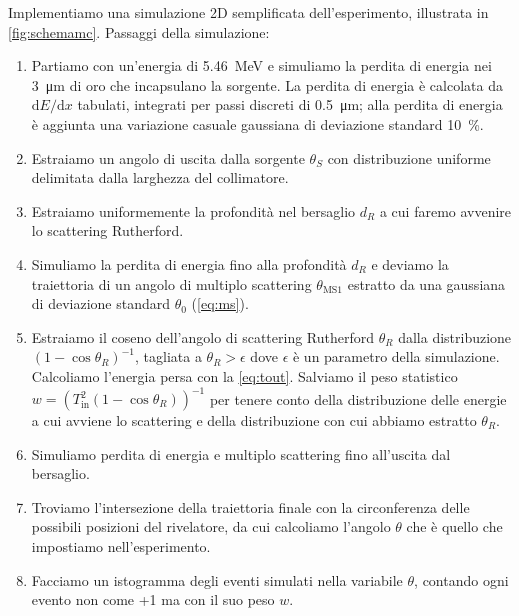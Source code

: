 Implementiamo una simulazione 2D semplificata dell'esperimento,
illustrata in \autoref{fig:schemamc}.
Passaggi della simulazione:
\begin{enumerate}
	\item
	Partiamo con un'energia di \SI{5.46}{MeV}
	e simuliamo la perdita di energia nei \SI{3}{\micro m} di oro che incapsulano la sorgente.
	La perdita di energia è calcolata da $\mathrm dE/\mathrm dx$ tabulati\footnotemark,
	integrati per passi discreti di \SI{0.5}{\micro m};
	alla perdita di energia è aggiunta una variazione casuale gaussiana di deviazione standard \SI{10}\%.
	\item
	Estraiamo un angolo di uscita dalla sorgente $\theta_S$ con distribuzione uniforme
	delimitata dalla larghezza del collimatore.
	\item
	Estraiamo uniformemente la profondità nel bersaglio $d_R$ a cui faremo avvenire lo scattering Rutherford.
	\item
	Simuliamo la perdita di energia fino alla profondità $d_R$
	e deviamo la traiettoria di un angolo di multiplo scattering $\theta_\text{MS1}$
	estratto da una gaussiana di deviazione standard $\theta_0$ (\autoref{eq:ms}).
	\item
	Estraiamo il coseno dell'angolo di scattering Rutherford $\theta_R$
	dalla distribuzione $(1-\cos\theta_R)^{-1}$,
	tagliata a $\theta_R>\epsilon$ dove $\epsilon$ è un parametro della simulazione.
	Calcoliamo l'energia persa con la \eqref{eq:tout}.
	Salviamo il peso statistico $w = (T_\text{in}^2 (1-\cos\theta_R))^{-1}$
	per tenere conto della distribuzione delle energie a cui avviene lo scattering
	e della distribuzione con cui abbiamo estratto $\theta_R$.
	\item
	Simuliamo perdita di energia e multiplo scattering fino all'uscita dal bersaglio.
	\item
	Troviamo l'intersezione della traiettoria finale con la circonferenza delle possibili posizioni del rivelatore,
	da cui calcoliamo l'angolo $\theta$ che è quello che impostiamo nell'esperimento.
	\item
	Facciamo un istogramma degli eventi simulati nella variabile $\theta$,
	contando ogni evento non come +1 ma con il suo peso $w$.
\end{enumerate}
